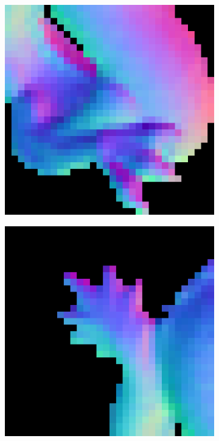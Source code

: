 \begin{figure}[th]
\begin{subfigure}[b]{0.18\linewidth}
	\end{subfigure}
	\begin{subfigure}[b]{0.18\linewidth}
		\includegraphics[width=\linewidth]{./Figures/gcnn_synthetic/eval_7_42_-28_normal.png}
	\end{subfigure}
	\begin{subfigure}[b]{0.18\linewidth}
		\includegraphics[width=\linewidth]{./Figures/gcnn_synthetic/eval_7_12_-48_normal.png}
	\end{subfigure}
	

\end{figure}
